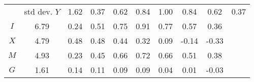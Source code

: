 \begin{tabular}{ccccccccc}
\toprule
 & std dev. %
\midrule
$Y$ & 1.62 & 0.37 & 0.62 & 0.84 & 1.00 & 0.84 & 0.62 & 0.37 \\
$I$ & 6.79 & 0.24 & 0.51 & 0.75 & 0.91 & 0.77 & 0.57 & 0.36 \\
$X$ & 4.79 & 0.48 & 0.48 & 0.44 & 0.32 & 0.09 & -0.14 & -0.33 \\
$M$ & 4.93 & 0.23 & 0.45 & 0.66 & 0.72 & 0.66 & 0.51 & 0.38 \\
$G$ & 1.61 & 0.14 & 0.11 & 0.09 & 0.09 & 0.04 & 0.01 & -0.03 \\
\bottomrule
\end{tabular}
